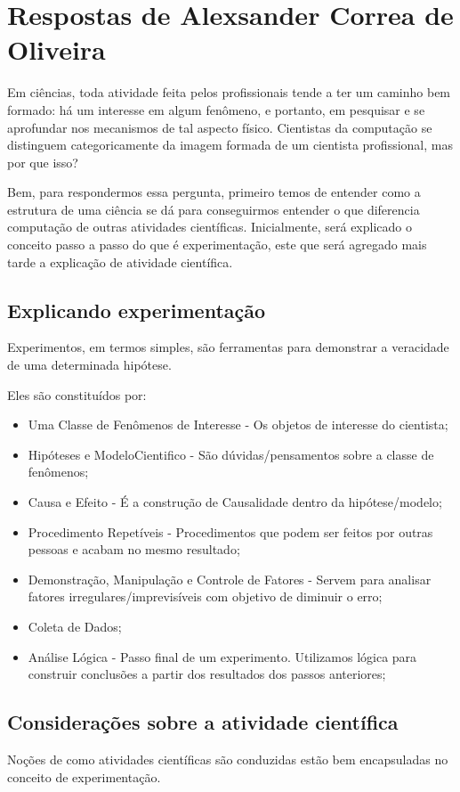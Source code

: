 \section{Respostas de Alexsander Correa de Oliveira}

Em ciências, toda atividade feita pelos profissionais tende a ter um caminho bem formado: há um interesse em algum fenômeno, e portanto, em pesquisar e se aprofundar nos mecanismos de tal aspecto físico. Cientistas da computação se distinguem categoricamente da imagem formada de um cientista profissional, mas por que isso?

Bem, para respondermos essa pergunta, primeiro temos de entender como a estrutura de uma ciência se dá para conseguirmos entender o que diferencia computação de outras atividades científicas. Inicialmente, será explicado o conceito passo a passo do que é experimentação, este que será agregado mais tarde a explicação de atividade científica.

\subsection{Explicando experimentação}

    Experimentos, em termos simples, são ferramentas para demonstrar a veracidade de uma determinada hipótese.
    
    Eles são constituídos por:
\begin{itemize}
    \item Uma Classe de Fenômenos de Interesse - Os objetos de interesse do cientista;
    \item Hipóteses e \gls{ModeloCientifico} - São dúvidas/pensamentos sobre a classe de fenômenos;
    \item Causa e Efeito - É a construção de \gls{Causalidade} dentro da hipótese/modelo;
    \item Procedimento Repetíveis - Procedimentos que podem ser feitos por outras pessoas e acabam no mesmo resultado;
    \item Demonstração, Manipulação e Controle de Fatores - Servem para analisar fatores irregulares/imprevisíveis com objetivo de diminuir o erro;
    \item Coleta de Dados;
    \item Análise Lógica - Passo final de um experimento. Utilizamos lógica para construir conclusões a partir dos resultados dos passos anteriores;
\end{itemize}

\subsection{Considerações sobre a atividade científica}
    Noções de como atividades científicas são conduzidas estão bem encapsuladas no conceito de experimentação.
    

